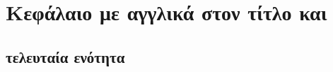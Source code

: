 \chapter{\texorpdfstring{Kεφάλαιο με αγγλικά στον τίτλο και }{Kεφάλαιο με αγγλικά στον τίτλο και pdf}}
\section{τελευταία ενότητα}
\en{\lipsum}

\en{\lipsum}